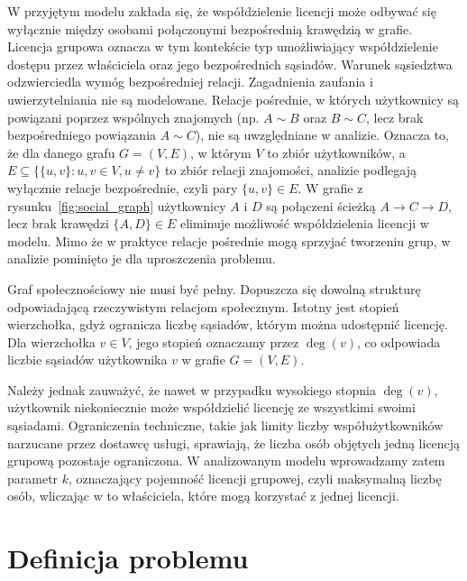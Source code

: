 W przyjętym modelu zakłada się, że współdzielenie licencji może odbywać się wyłącznie między osobami połączonymi bezpośrednią krawędzią w grafie. Licencja grupowa oznacza w tym kontekście typ umożliwiający współdzielenie dostępu przez właściciela oraz jego bezpośrednich sąsiadów. Warunek sąsiedztwa odzwierciedla wymóg bezpośredniej relacji. Zagadnienia zaufania i uwierzytelniania nie są modelowane. Relacje pośrednie, w których użytkownicy są powiązani poprzez wspólnych znajomych (np. \( A \sim B \) oraz \( B \sim C \), lecz brak bezpośredniego powiązania \( A \sim C \)), nie są uwzględniane w analizie. Oznacza to, że dla danego grafu \( G = (V, E) \),
w którym \( V \) to zbiór użytkowników, a \( E \subseteq \{ \{u,v\} : u,v \in V, u \neq v \} \) to zbiór relacji znajomości, analizie podlegają wyłącznie relacje bezpośrednie, czyli pary \( \{u, v\} \in E \).
W grafie z rysunku~\ref{fig:social_graph} użytkownicy \( A \) i \( D \) są połączeni ścieżką \( A \rightarrow C \rightarrow D \), lecz brak krawędzi \( \{A,D\} \in E \) eliminuje możliwość współdzielenia licencji w modelu.
Mimo że w praktyce relacje pośrednie mogą sprzyjać tworzeniu grup, w analizie pominięto je dla uproszczenia problemu.

Graf społecznościowy nie musi być pełny. Dopuszcza się dowolną strukturę odpowiadającą rzeczywistym relacjom społecznym. Istotny jest stopień wierzchołka, gdyż ogranicza liczbę sąsiadów, którym można udostępnić licencję. Dla wierzchołka \( v \in V \), jego stopień oznaczamy przez \( \deg(v) \), co odpowiada liczbie sąsiadów użytkownika \( v \) w grafie \( G = (V, E) \).

Należy jednak zauważyć, że nawet w przypadku wysokiego stopnia \( \deg(v) \), użytkownik niekoniecznie może współdzielić licencję ze wszystkimi swoimi sąsiadami. Ograniczenia techniczne, takie jak limity liczby współużytkowników narzucane przez dostawcę usługi, sprawiają, że liczba osób objętych jedną licencją grupową pozostaje ograniczona. W analizowanym modelu wprowadzamy zatem parametr \( k \), oznaczający pojemność licencji grupowej, czyli maksymalną liczbę osób, wliczając w to właściciela, które mogą korzystać z jednej licencji.



\section{Definicja problemu}\label{sec:model-formal}

